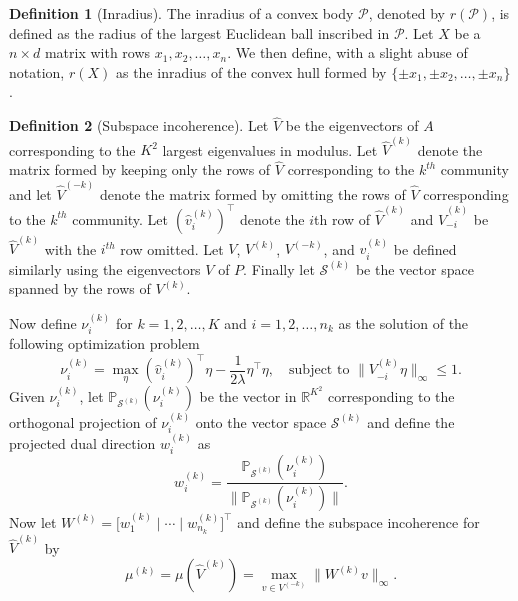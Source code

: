 \documentclass[
  12pt,
]{article}
\theoremstyle{definition}
\newtheorem{definition}{Definition}[section]
\theoremstyle{definition}
\theoremstyle{definition}
\theoremstyle{definition}
\theoremstyle{remark}
\begin{document}
\begin{definition}[Inradius]
\label{def:inradius}
The inradius of a convex body $\mathcal{P}$, denoted by $r(\mathcal{P})$, is
defined as the radius of the largest Euclidean ball inscribed in $\mathcal{P}$.
Let $X$ be a $n \times d$ matrix with rows $x_1, x_2, \dots,
x_n$. We then define, with a slight abuse of notation, $r(X)$ as the
inradius of the convex hull formed by $\{\pm x_1, \pm x_2, \dots, \pm x_n\}$. 
\end{definition}

\begin{definition}[Subspace incoherence]
\label{def:subspace_incoherence}
Let $\hat{V}$ be the eigenvectors of $A$
corresponding to the $K^2$ largest eigenvalues in modulus. Let
$\hat{V}^{(k)}$ denote the matrix formed by keeping only the rows of
$\hat{V}$ corresponding to the $k^{th}$
community and let $\hat{V}^{(-k)}$ denote the matrix formed by
omitting the rows of $\hat{V}$
corresponding to the $k^{th}$ community. Let $(\hat{v}_i^{(k)})^\top$ denote
the $i$th row of $\hat{V}^{(k)}$ and $\hat{V}_{-i}^{(k)}$ be $\hat{V}^{(k)}$ with
the $i^{th}$ row omitted. Let $V$, $V^{(k)}$, $V^{(-k)}$, and
$v_i^{(k)}$ be defined similarly using the eigenvectors $V$ of
$P$. Finally let $\mathcal{S}^{(k)}$ be the vector space spanned by the
rows of $V^{(k)}$. 

Now define $\nu_{i}^{(k)}$ for $k = 1,2,\dots,K$ and $i =
1,2,\dots,n_{k}$ as the solution of the following optimization problem
$$\nu_{i}^{(k)} = \max_\eta (\hat{v}_i^{(k)})^\top \eta - \frac{1}{2
\lambda} \eta^\top \eta, \quad \text{subject to $\|V_{-i}^{(k)}
\eta\|_\infty \leq 1$.}$$
Given $\nu_i^{(k)}$, let $\mathbb{P}_{\mathcal{S}^{(k)}}(\nu_i^{(k)})$
be the vector in $\mathbb{R}^{K^2}$ corresponding to the orthogonal projection of $\nu_i^{(k)}$ onto the vector space
$\mathcal{S}^{(k)}$ and define the projected dual direction $w_{i}^{(k)}$
as
$$w_i^{(k)} =
\frac{\mathbb{P}_{\mathcal{S}^{(k)}}(\nu_i^{(k)})}{\|\mathbb{P}_{\mathcal{S}^{(k)}}(\nu_i^{(k)})\|}.$$
Now let $W^{(k)} = \bigl[ w_1^{(k)} \mid \cdots \mid w_{n_k}^{(k)} \bigr]^\top$
and define the subspace incoherence for $\hat{V}^{(k)}$ by
$$\mu^{(k)} = \mu(\hat{V}^{(k)}) = \max\limits_{v \in V^{(-k)}} \|W^{(k)} v\|_\infty.$$
\end{definition}
\end{document}
